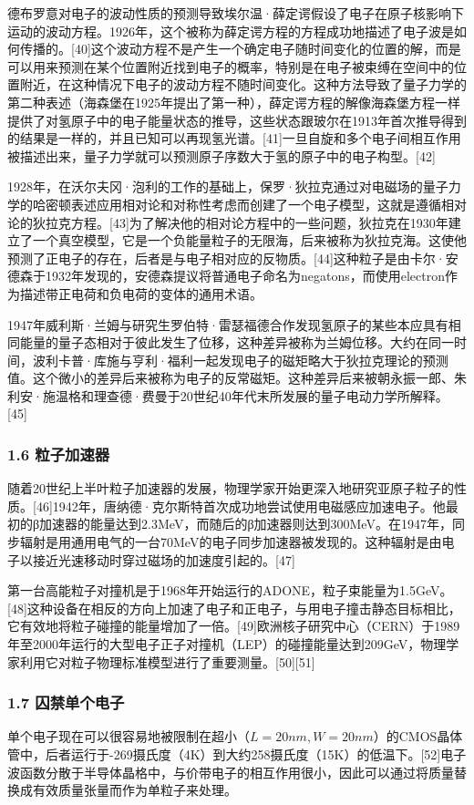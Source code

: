 德布罗意对电子的波动性质的预测导致埃尔温·薛定谔假设了电子在原子核影响下运动的波动方程。1926年，这个被称为薛定谔方程的方程成功地描述了电子波是如何传播的。[40]这个波动方程不是产生一个确定电子随时间变化的位置的解，而是可以用来预测在某个位置附近找到电子的概率，特别是在电子被束缚在空间中的位置附近，在这种情况下电子的波动方程不随时间变化。这种方法导致了量子力学的第二种表述（海森堡在1925年提出了第一种），薛定谔方程的解像海森堡方程一样提供了对氢原子中的电子能量状态的推导，这些状态跟玻尔在1913年首次推导得到的结果是一样的，并且已知可以再现氢光谱。[41]一旦自旋和多个电子间相互作用被描述出来，量子力学就可以预测原子序数大于氢的原子中的电子构型。[42]

1928年，在沃尔夫冈·泡利的工作的基础上，保罗·狄拉克通过对电磁场的量子力学的哈密顿表述应用相对论和对称性考虑而创建了一个电子模型，这就是遵循相对论的狄拉克方程。[43]为了解决他的相对论方程中的一些问题，狄拉克在1930年建立了一个真空模型，它是一个负能量粒子的无限海，后来被称为狄拉克海。这使他预测了正电子的存在，后者是与电子相对应的反物质。[44]这种粒子是由卡尔·安德森于1932年发现的，安德森提议将普通电子命名为negatons，而使用electron作为描述带正电荷和负电荷的变体的通用术语。

1947年威利斯·兰姆与研究生罗伯特·雷瑟福德合作发现氢原子的某些本应具有相同能量的量子态相对于彼此发生了位移，这种差异被称为兰姆位移。大约在同一时间，波利卡普·库施与亨利·福利一起发现电子的磁矩略大于狄拉克理论的预测值。这个微小的差异后来被称为电子的反常磁矩。这种差异后来被朝永振一郎、朱利安·施温格和理查德·费曼于20世纪40年代末所发展的量子电动力学所解释。[45]
\subsubsection{1.6 粒子加速器}
随着20世纪上半叶粒子加速器的发展，物理学家开始更深入地研究亚原子粒子的性质。[46]1942年，唐纳德·克尔斯特首次成功地尝试使用电磁感应加速电子。他最初的β加速器的能量达到2.3MeV，而随后的β加速器则达到300MeV。在1947年，同步辐射是用通用电气的一台70MeV的电子同步加速器被发现的。这种辐射是由电子以接近光速移动时穿过磁场的加速度引起的。[47]

第一台高能粒子对撞机是于1968年开始运行的ADONE，粒子束能量为1.5GeV。[48]这种设备在相反的方向上加速了电子和正电子，与用电子撞击静态目标相比，它有效地将粒子碰撞的能量增加了一倍。[49]欧洲核子研究中心（CERN）于1989年至2000年运行的大型电子正子对撞机（LEP）的碰撞能量达到209GeV，物理学家利用它对粒子物理标准模型进行了重要测量。[50][51]
\subsubsection{1.7 囚禁单个电子}
单个电子现在可以很容易地被限制在超小（$L = 20 nm,W = 20 nm$）的CMOS晶体管中，后者运行于-269摄氏度（4K）到大约258摄氏度（15K）的低温下。[52]电子波函数分散于半导体晶格中，与价带电子的相互作用很小，因此可以通过将质量替换成有效质量张量而作为单粒子来处理。

